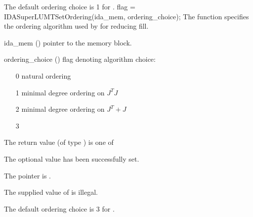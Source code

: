 {{\begin{args}
  \end{args}
}
{
  The default ordering choice is 1 for .
}
{
  flag = IDASuperLUMTSetOrdering(ida\_mem, ordering\_choice);
}
{
  The function  specifies the ordering algorithm
  used by {\idasuperlumt} for reducing fill.
}
{
  \begin{args}
  \item[ida\_mem] ()
    pointer to the {\ida} memory block.
  \item[ordering\_choice] ()
    flag denoting algorithm choice:
    \begin{itemize}
    \item[0] natural ordering
    \item[1] minimal degree ordering on $J^TJ$
    \item[2] minimal degree ordering on $J^T + J$
    \item[3] 
    \end{itemize}
  \end{args}
}
{
  The return value  (of type ) is one of
  \begin{args}
  \item[\Id{IDASLS\_SUCCESS}] 
    The optional value has been successfully set.
  \item[\Id{IDASLS\_MEM\_NULL}]
    The  pointer is .
  \item[\Id{IDASLS\_ILL\_INPUT}]
    The supplied value of  is illegal.
  \end{args}
}
{
  The default ordering choice is 3 for .
}
}
